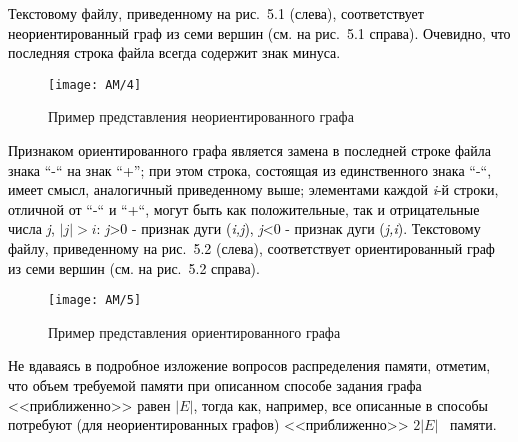 \textcolor{black}{Текстовому файлу, приведенному на рис.~5.1 (слева), соответствует неориентированный граф из семи вершин
	(см. на рис.~5.1 справа). Очевидно, что последняя строка файла всегда содержит знак минуса. }

\begin{figure}[H]
	\centering
	\texttt{[image: AM/4]}
	\caption{Пример представления неориентированного графа}
\end{figure}

\textcolor{black}{Признаком ориентированного графа является замена в последней строке файла знака “-“ на знак “+”; при
	этом строка, состоящая из единственного знака “-“, имеет смысл, аналогичный приведенному выше; элементами каждой
}\foreignlanguage{english}{\textit{\textcolor{black}{i}}}\textcolor{black}{{}-й строки, отличной от “-“ и “+“, могут
	быть как положительные, так и отрицательные числа
}\foreignlanguage{english}{\textit{\textcolor{black}{j}}}\textcolor{black}{, } $\left|j\right|>i$\textcolor{black}{:
}\foreignlanguage{english}{\textit{\textcolor{black}{j}}}\textcolor{black}{{\textgreater}0 - признак дуги
	(}\foreignlanguage{english}{\textit{\textcolor{black}{i}}}\textit{\textcolor{black}{,}}\foreignlanguage{english}{\textit{\textcolor{black}{j}}}\textcolor{black}{),
}\foreignlanguage{english}{\textit{\textcolor{black}{j}}}\textcolor{black}{{\textless}0 - признак дуги
	(}\foreignlanguage{english}{\textit{\textcolor{black}{j}}}\textit{\textcolor{black}{,}}\foreignlanguage{english}{\textit{\textcolor{black}{i}}}\textcolor{black}{).
	Текстовому файлу, приведенному на рис.~5.2 (слева), соответствует ориентированный граф из семи вершин (см. на рис.~5.2
	справа).}

\begin{figure}[H]
	\centering
	\texttt{[image: AM/5]}
	\caption{Пример представления ориентированного графа}
\end{figure}

\textcolor{black}{Не вдаваясь в подробное изложение вопросов распределения памяти, отметим, что объем требуемой памяти
	при описанном способе задания графа <<приближенно>> равен } $|E|$\textcolor{black}{, тогда как, например, все
	описанные в \cite[C. 203]{AKM_ch5_bib1} способы потребуют (для неориентированных графов) <<приближенно>> } $2|E|$
\textcolor{black}{\ памяти.}

